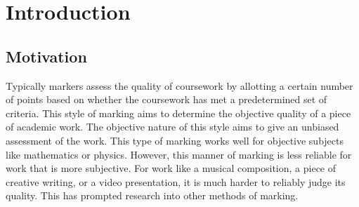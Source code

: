 \documentclass{l4proj}
\begin{document}
%
%
%
%
%
%
%
%
\chapter{Introduction}


\section{Motivation}
Typically markers assess the quality of coursework by allotting a certain number of points based on whether the coursework has met a predetermined set of criteria. This style of marking aims to determine the objective quality of a piece of academic work. The objective nature of this style aims to give an unbiased assessment of the work. This type of marking works well for objective subjects like mathematics or physics. However, this manner of marking is less reliable for work that is more subjective. For work like a musical composition, a piece of creative writing, or a video presentation, it is much harder to reliably judge its quality. This has prompted research into other methods of marking.
\end{document}
